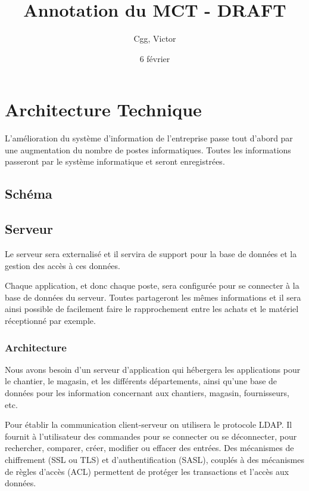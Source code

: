 \documentclass[a4paper]{article}
\title{Annotation du MCT - DRAFT}
\author{Cgg, Victor}
\date{6 février}
\begin{document}
\section{Architecture Technique}
L'amélioration du système d’information de l'entreprise passe tout d'abord par une augmentation du nombre de postes
informatiques. Toutes les informations passeront par le système informatique et seront enregistrées.

\subsection{Schéma}



\subsection{Serveur}

Le serveur sera externalisé et il servira de support pour la base de données et la gestion des accès à ces données. 

Chaque application, et donc chaque poste, sera configurée pour se connecter à la base de données du serveur. 
Toutes partageront les mêmes informations et il sera ainsi possible de facilement faire le rapprochement entre 
les achats et le matériel réceptionné par exemple.

	\subsubsection{Architecture}
Nous avons besoin d'un serveur d'application qui hébergera les applications pour le chantier, le magasin, et les différents 
départements,  ainsi qu'une base de données pour les information concernant aux chantiers, magasin, fournisseurs, etc. 

Pour établir la communication client-serveur on utilisera le protocole LDAP. Il fournit à l'utilisateur des commandes 
pour se connecter ou se déconnecter,  pour rechercher, comparer, créer, modifier ou effacer des entrées. 
Des mécanismes de chiffrement (SSL ou TLS) et d'authentification (SASL), couplés à des mécanismes de règles d'accès (ACL) 
permettent de protéger les transactions et l'accès aux données.
\end{document}
